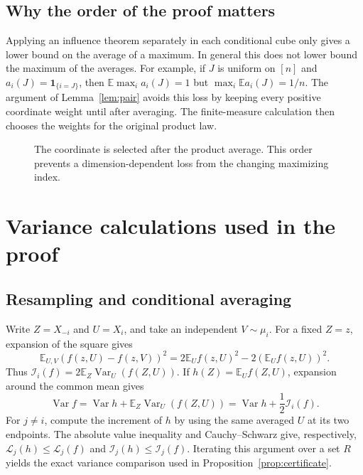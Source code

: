\documentclass[11pt,reqno]{amsart}
\theoremstyle{definition}
\theoremstyle{remark}
\newcommand{\E}{\mathbb E}
\newcommand{\Var}{\operatorname{Var}}
\newcommand{\one}{\mathbf 1}
\newcommand{\cI}{\mathcal I}
\newcommand{\cL}{\mathcal L}
\numberwithin{equation}{section}
\begin{document}
\subsection{Why the order of the proof matters}
Applying an influence theorem separately in each conditional cube
only gives a lower bound on the average of a maximum. In general this
does not lower bound the maximum of the averages. For example, if
$J$ is uniform on $[n]$ and $a_i(J)=\one_{\{i=J\}}$, then
$\E\max_i a_i(J)=1$ but $\max_i\E a_i(J)=1/n$.
The argument of Lemma~\ref{lem:pair} avoids this loss by keeping every
positive coordinate weight until after averaging. The finite-measure
calculation then chooses the weights for the original product law.

\begin{figure}[tb]
\centering
{}
\caption{The coordinate is selected after the product average. This order
prevents a dimension-dependent loss from the changing maximizing index.}
\end{figure}

\section{Variance calculations used in the proof}

\subsection{Resampling and conditional averaging}
Write $Z=X_{-i}$ and $U=X_i$, and take an independent $V\sim\mu_i$.
For a fixed $Z=z$, expansion of the square gives
\[
 \E_{U,V}(f(z,U)-f(z,V))^2
 =2\E_U f(z,U)^2-2(\E_U f(z,U))^2.
\]
Thus $\cI_i(f)=2\E_Z\Var_U(f(Z,U))$.
If $h(Z)=\E_U f(Z,U)$, expansion around the common mean gives
\[
 \Var f=\Var h+\E_Z\Var_U(f(Z,U))
          =\Var h+\frac12\cI_i(f).
\]
For $j\ne i$, compute the increment of $h$ by using the same averaged
$U$ at its two endpoints. The absolute value inequality and
Cauchy--Schwarz give, respectively, $\cL_j(h)\le\cL_j(f)$ and
$\cI_j(h)\le\cI_j(f)$. Iterating this argument over a set $R$ yields
the exact variance comparison used in Proposition~\ref{prop:certificate}.
\end{document}
